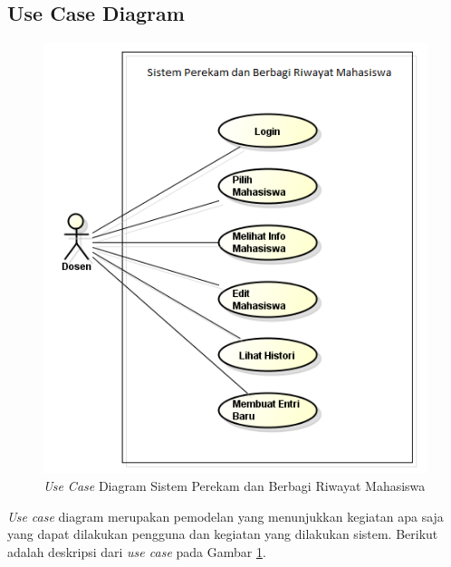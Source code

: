 \subsection{Use Case Diagram}
\begin{figure}[ht]
\centering
\includegraphics[scale=0.8]{Gambar/usecase.png}
\caption[{\it Use Case} Diagram Sistem Perekam dan Berbagi Riwayat Mahasiswa]{{\it Use
Case} Diagram Sistem Perekam dan Berbagi Riwayat Mahasiswa}
\label{fig:usecase}
\end{figure}

{\it Use case} diagram merupakan pemodelan yang menunjukkan kegiatan apa saja
yang dapat dilakukan pengguna dan kegiatan yang dilakukan sistem. Berikut adalah
deskripsi dari {\it use case} pada Gambar \ref{fig:usecase}.

